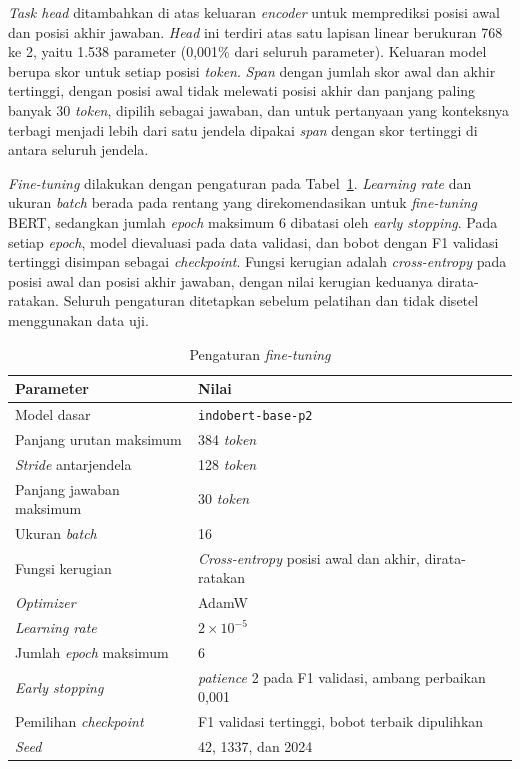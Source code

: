 \textit{Task head} ditambahkan di atas keluaran \textit{encoder} untuk memprediksi posisi awal dan posisi akhir jawaban. \textit{Head} ini terdiri atas satu lapisan linear berukuran 768 ke 2, yaitu 1.538 parameter (0,001\% dari seluruh parameter). Keluaran model berupa skor untuk setiap posisi \textit{token}. \textit{Span} dengan jumlah skor awal dan akhir tertinggi, dengan posisi awal tidak melewati posisi akhir dan panjang paling banyak 30 \textit{token}, dipilih sebagai jawaban, dan untuk pertanyaan yang konteksnya terbagi menjadi lebih dari satu jendela dipakai \textit{span} dengan skor tertinggi di antara seluruh jendela.

\textit{Fine-tuning} dilakukan dengan pengaturan pada Tabel~\ref{tab:hyperparameter}. \textit{Learning rate} dan ukuran \textit{batch} berada pada rentang yang direkomendasikan \textcite{devlin2019bert} untuk \textit{fine-tuning} BERT, sedangkan jumlah \textit{epoch} maksimum 6 dibatasi oleh \textit{early stopping}. Pada setiap \textit{epoch}, model dievaluasi pada data validasi, dan bobot dengan F1 validasi tertinggi disimpan sebagai \textit{checkpoint}. Fungsi kerugian adalah \textit{cross-entropy} pada posisi awal dan posisi akhir jawaban, dengan nilai kerugian keduanya dirata-ratakan. Seluruh pengaturan ditetapkan sebelum pelatihan dan tidak disetel menggunakan data uji.

\begin{table}[!ht]
  \centering
  \small
  \renewcommand{\arraystretch}{1.2}
  \caption{Pengaturan \textit{fine-tuning}}
  \label{tab:hyperparameter}
  \begin{tabularx}{\textwidth}{@{}>{\raggedright\arraybackslash}p{6.2cm}X@{}}
    \hline
    \textbf{Parameter} & \textbf{Nilai} \\
    \hline
    Model dasar & \texttt{indobert-base-p2} \\
    Panjang urutan maksimum & 384 \textit{token} \\
    \textit{Stride} antarjendela & 128 \textit{token} \\
    Panjang jawaban maksimum & 30 \textit{token} \\
    Ukuran \textit{batch} & 16 \\
    Fungsi kerugian & \textit{Cross-entropy} posisi awal dan akhir, dirata-ratakan \\
    \textit{Optimizer} & AdamW \\
    \textit{Learning rate} & $2 \times 10^{-5}$ \\
    Jumlah \textit{epoch} maksimum & 6 \\
    \textit{Early stopping} & \textit{patience} 2 pada F1 validasi, ambang perbaikan 0,001 \\
    Pemilihan \textit{checkpoint} & F1 validasi tertinggi, bobot terbaik dipulihkan \\
    \textit{Seed} & 42, 1337, dan 2024 \\
    \hline
  \end{tabularx}
\end{table}

